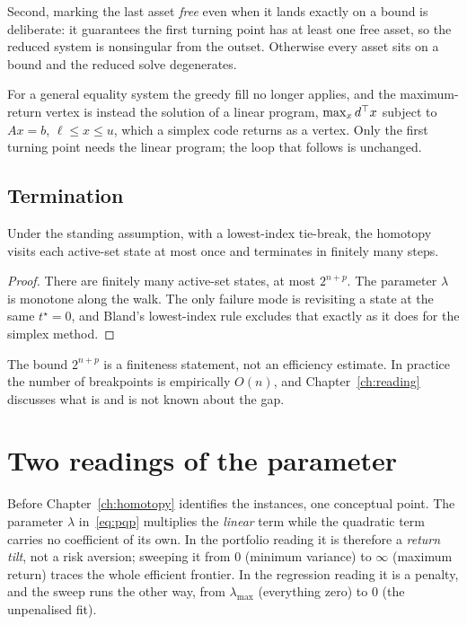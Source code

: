 Second, marking the last asset \emph{free} even when it lands exactly on a bound is
deliberate: it guarantees the first turning point has at least one free asset, so the
reduced system is nonsingular from the outset. Otherwise every asset sits on a bound
and the reduced solve degenerates.

For a general equality system the greedy fill no longer applies, and the
maximum-return vertex is instead the solution of a linear program,
$\max_x d^{\top} x$ subject to $Ax = b$, $\ell \le x \le u$, which a simplex code
returns as a vertex. Only the first turning point needs the linear program; the loop
that follows is unchanged.

\subsection{Termination}

\begin{proposition}
\label{prop:homotopy-finite}
Under the standing assumption, with a lowest-index tie-break, the homotopy visits
each active-set state at most once and terminates in finitely many steps.
\end{proposition}

\begin{proof}
There are finitely many active-set states, at most $2^{n+p}$. The parameter
$\lambda$ is monotone along the walk. The only failure mode is revisiting a state at
the same $t^\star = 0$, and Bland's lowest-index rule excludes that exactly as it
does for the simplex method.
\end{proof}

The bound $2^{n+p}$ is a finiteness statement, not an efficiency estimate. In
practice the number of breakpoints is empirically $O(n)$, and
Chapter~\ref{ch:reading} discusses what is and is not known about the gap.

\section{Two readings of the parameter}

Before Chapter~\ref{ch:homotopy} identifies the instances, one conceptual point.
The parameter $\lambda$ in~\eqref{eq:pqp} multiplies the \emph{linear} term while
the quadratic term carries no coefficient of its own. In the portfolio reading it is
therefore a \emph{return tilt}, not a risk aversion; sweeping it from $0$ (minimum
variance) to $\infty$ (maximum return) traces the whole efficient frontier. In the
regression reading it is a penalty, and the sweep runs the other way, from
$\lambda_{\max}$ (everything zero) to $0$ (the unpenalised fit).

